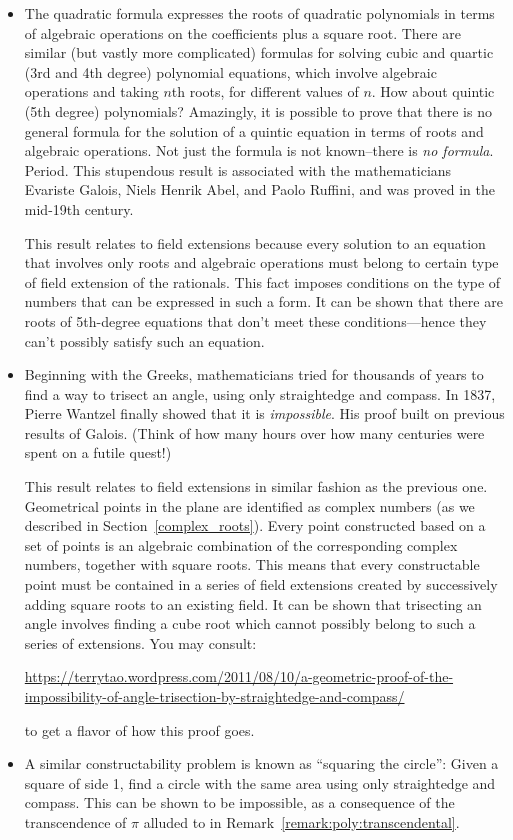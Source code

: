 \begin{itemize}
\item 
The quadratic formula expresses the roots of quadratic polynomials  in terms of algebraic operations on the coefficients plus a square root. There are similar (but vastly more complicated) formulas for solving cubic and quartic (3rd and 4th degree)  polynomial equations, which involve algebraic operations and  taking $n$th roots, for different values of $n$.  How about quintic (5th degree) polynomials?  Amazingly, it is possible to prove that there is no general formula for the solution of a quintic equation in terms of roots and algebraic operations.  Not just the formula is not known--there is \emph{no formula}. Period. This stupendous result is associated with the mathematicians Evariste Galois, Niels Henrik Abel, and Paolo Ruffini, and was proved in the mid-19th century.

This result relates to field extensions because every solution to an equation that involves only roots and algebraic operations must belong to certain type of field extension of the rationals. This fact imposes conditions on the type of numbers that can be expressed in such a form. It can be shown that there are roots of 5th-degree equations that don't meet these conditions---hence they can't possibly satisfy such an equation.

\item
Beginning with the Greeks,  mathematicians tried for thousands of years to find a way to trisect an angle, using only straightedge and compass. In 1837, Pierre Wantzel finally showed that it is \emph{impossible}. His proof built on previous results of Galois. (Think of how many hours over how many centuries were spent on a futile quest!)

This result relates to field extensions in similar fashion as the previous one. Geometrical points in the plane are identified as complex numbers (as we described in Section~\ref{complex_roots}). Every point constructed based on a set of  points is an algebraic combination of the corresponding complex numbers, together with square roots. This means that every constructable point must be contained in a series of field extensions created by successively adding square roots to an existing field. It can be shown that trisecting an angle involves finding a cube root which cannot possibly belong to such a series of extensions.  You may consult:

\noindent
 \url{https://terrytao.wordpress.com/2011/08/10/a-geometric-proof-of-the-impossibility-of-angle-trisection-by-straightedge-and-compass/}

\noindent
 to get a flavor of how this proof goes.
\item
A similar constructability problem is known as ``squaring the circle'':  Given a square of side 1, find a circle with the same area using only straightedge and compass. This can be shown to be impossible, as a consequence of the transcendence of $\pi$ alluded to in Remark~\ref{remark:poly:transcendental}.
\end{itemize}


